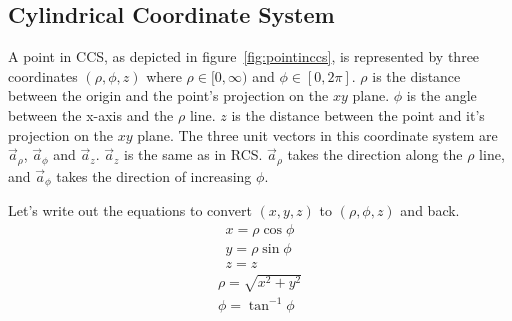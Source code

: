         \subsection{Cylindrical Coordinate System}
            
            A point in CCS, as depicted in figure~\ref{fig:pointinccs}, is represented by three coordinates $\left(\rho, \phi, z\right)$ where $\rho \in [0, \infty)$ and $\phi \in [0, 2\pi]$. $\rho$ is the distance between the origin and the point's projection on the $xy$ plane. $\phi$ is the angle between the x-axis and the $\rho$ line. $z$ is the distance between the point and it's projection on the $xy$ plane. The three unit vectors in this coordinate system are $\vec{a}_\rho$, $\vec{a}_\phi$ and $\vec{a}_z$. $\vec{a}_z$ is the same as in RCS. $\vec{a}_\rho$ takes the direction along the $\rho$ line, and $\vec{a}_\phi$ takes the direction of increasing $\phi$.
            
            Let's write out the equations to convert $(x, y, z)$ to $(\rho, \phi, z)$ and back.
            \begin{align}
                x = \rho\cos\phi \\
                y = \rho\sin\phi \\
                z = z
            \end{align}
            \begin{align}
                \rho = \sqrt{x^2+y^2} \\
                \phi = \tan^{-1}\phi
            \end{align}

